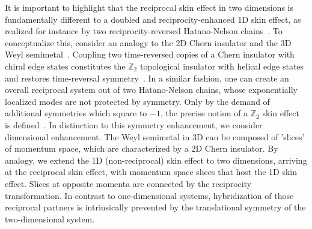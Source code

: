 It is important to highlight that the reciprocal skin effect in two dimensions is fundamentally different to a doubled and reciprocity-enhanced 1D skin effect, as realized for instance by two reciprocity-reversed Hatano-Nelson chains~\cite{hatano-nelson}. To conceptualize this, consider an analogy to the 2D Chern insulator and the 3D Weyl semimetal~\cite{Shuichi_Murakami_2007}. Coupling two time-reversed copies of a Chern insulator with chiral edge states constitutes the $\mathbb{Z}_2$ topological insulator with helical edge states and restores time-reversal symmetry~\cite{PhysRevLett.95.146802}. In a similar fashion, one can create an overall reciprocal system out of two Hatano-Nelson chains, whose exponentially localized modes are not protected by symmetry. Only by the demand of additional symmetries which square to $-1$, the precise notion of a $\mathbb{Z}_2$ skin effect is defined~\cite{okuma2019topological}. In distinction to this symmetry enhancement, we consider dimensional enhancement. The Weyl semimetal in 3D can be composed of 'slices' of momentum space, which are characterized by a 2D Chern insulator. By analogy, we extend the 1D (non-reciprocal) skin effect to two dimensions, arriving at the reciprocal skin effect, with momentum space slices that host the 1D skin effect. Slices at opposite momenta are connected by the reciprocity transformation. In contrast to one-dimensional systems, hybridization of those reciprocal partners is intrinsically prevented by the translational symmetry of the two-dimensional system.

